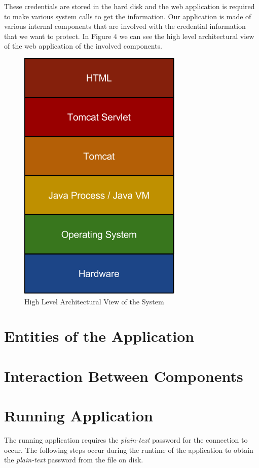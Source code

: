 \documentclass[11pt, a4paper, twoside, openany, notitlepage]{report}
\begin{document}
These credentials are stored in the hard disk and the web application is required to make various system calls to get the information. Our application is made of various internal components that are involved with the credential  information that we want to protect. In Figure 4 we can see the high level architectural view of the web application of the involved components. 

\begin{figure}[h!]
    \centering
    \includegraphics[height=0.2\paperheight]{high-level-archecuture}
    \caption{High Level Architectural View of the System}
\end{figure}

\section*{Entities of the Application}


\section*{Interaction Between Components}
\section*{Running Application}
The running application requires the \emph{plain-text} password for the connection to occur. The following steps occur during the runtime of the application to obtain the \emph{plain-text} password from the file on disk. 
\end{document}
